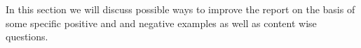 \documentclass[../review.tex]{subfiles}
\begin{document}
In this section we will discuss possible ways to improve the report on the basis of some specific positive and and negative examples as well as content wise questions.
\end{document}
